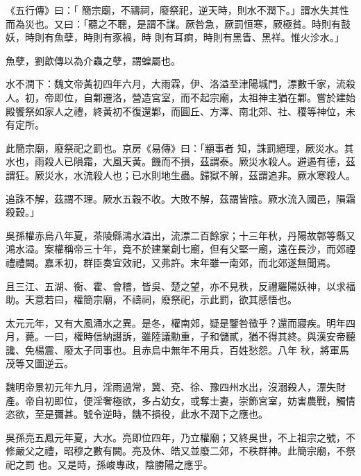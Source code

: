 
\begin{pinyinscope}

 《五行傳》曰：「
 簡宗廟，不禱祠，廢祭祀，逆天時，則水不潤下。」謂水失其性而為災也。又曰：「聽之不聰，是謂不謀。厥咎急，厥罰恒寒，厥極貧。時則有鼓妖，時則有魚孽，時則有豕禍，時
 則有耳痾，時則有黑眚、黑祥。惟火沴水。」



 魚孽，劉歆傳以為介蟲之孽，謂蝗屬也。



 水不潤下：魏文帝黃初四年六月，大雨霖，伊、洛溢至津陽城門，漂數千家，流殺人。初，帝即位，自鄴遷洛，營造宮室，而不起宗廟，太祖神主猶在鄴。嘗於建始殿饗祭如家人之禮，終黃初不復還鄴，而圓丘、方澤、南北郊、社、稷等神位，未有定所。



 此簡宗廟，廢祭祀之罰也。京房《易傳》曰：「顓事者
 知，誅罰絕理，厥災水。其水也，雨殺人已隕霜，大風天黃。饑而不損，茲謂泰。厥災水殺人。避遏有德，茲謂狂。厥災水，水流殺人也；已水則地生蟲。歸獄不解，茲謂追非。厥水寒殺人。



 追誅不解，茲謂不理。厥水五穀不收。大敗不解，茲謂皆陰。厥水流入國邑，隕霜殺穀。」



 吳孫權赤烏八年夏，茶陵縣鴻水溢出，流漂二百餘家；十三年秋，丹陽故鄣等縣又鴻水溢。案權稱帝三十年，竟不於建業創七廟，但有父堅一廟，遠在長沙，而郊禋
 禮禮闕。嘉禾初，群臣奏宜效祀，又弗許。末年雖一南郊，而北郊遂無聞焉。



 且三江、五湖、衡、霍、會稽，皆吳、楚之望，亦不見秩，反禮羅陽妖神，以求福助。天意若曰，權簡宗廟，不禱祠，廢祭祀，示此罰，欲其感悟也。



 太元元年，又有大風涌水之異。是冬，權南郊，疑是鑒咎徵乎？還而寢疾。明年四月，薨。一曰，權時信納譖訴，雖陸議勳重，子和儲貳，猶不得其終。與漢安帝聽讒、免楊震、廢太子同事也。且赤烏中無年不用兵，百姓愁怨。八年
 秋，將軍馬茂等又圖逆云。



 魏明帝景初元年九月，淫雨過常，冀、兗、徐、豫四州水出，沒溺殺人，漂失財產。帝自初即位，便淫奢極欲，多占幼女，或奪士妻，崇飾宮室，妨害農戰，觸情恣欲，至是彌甚。號令逆時，饑不損役，此水不潤下之應也。



 吳孫亮五鳳元年夏，大水。亮即位四年，乃立權廟；又終吳世，不上祖宗之號，不修嚴父之禮，昭穆之數有闕。亮及休、皓又並廢二郊，不秩群神。此簡宗廟，不祭祀之罰
 也。又是時，孫峻專政，陰勝陽之應乎。




\end{pinyinscope}
